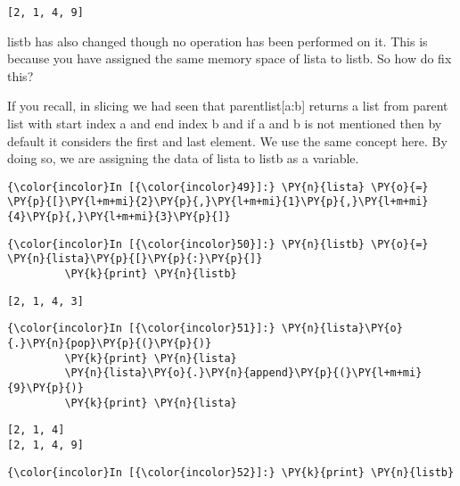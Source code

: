     \begin{Verbatim}[commandchars=\\\{\}]
[2, 1, 4, 9]
    \end{Verbatim}

    listb has also changed though no operation has been performed on it.
This is because you have assigned the same memory space of lista to
listb. So how do fix this?

If you recall, in slicing we had seen that parentlist{[}a:b{]} returns a
list from parent list with start index a and end index b and if a and b
is not mentioned then by default it considers the first and last
element. We use the same concept here. By doing so, we are assigning the
data of lista to listb as a variable.

    \begin{Verbatim}[commandchars=\\\{\}]
{\color{incolor}In [{\color{incolor}49}]:} \PY{n}{lista} \PY{o}{=} \PY{p}{[}\PY{l+m+mi}{2}\PY{p}{,}\PY{l+m+mi}{1}\PY{p}{,}\PY{l+m+mi}{4}\PY{p}{,}\PY{l+m+mi}{3}\PY{p}{]}
\end{Verbatim}

    \begin{Verbatim}[commandchars=\\\{\}]
{\color{incolor}In [{\color{incolor}50}]:} \PY{n}{listb} \PY{o}{=} \PY{n}{lista}\PY{p}{[}\PY{p}{:}\PY{p}{]}
         \PY{k}{print} \PY{n}{listb}
\end{Verbatim}

    \begin{Verbatim}[commandchars=\\\{\}]
[2, 1, 4, 3]
    \end{Verbatim}

    \begin{Verbatim}[commandchars=\\\{\}]
{\color{incolor}In [{\color{incolor}51}]:} \PY{n}{lista}\PY{o}{.}\PY{n}{pop}\PY{p}{(}\PY{p}{)}
         \PY{k}{print} \PY{n}{lista}
         \PY{n}{lista}\PY{o}{.}\PY{n}{append}\PY{p}{(}\PY{l+m+mi}{9}\PY{p}{)}
         \PY{k}{print} \PY{n}{lista}
\end{Verbatim}

    \begin{Verbatim}[commandchars=\\\{\}]
[2, 1, 4]
[2, 1, 4, 9]
    \end{Verbatim}

    \begin{Verbatim}[commandchars=\\\{\}]
{\color{incolor}In [{\color{incolor}52}]:} \PY{k}{print} \PY{n}{listb}
\end{Verbatim}

